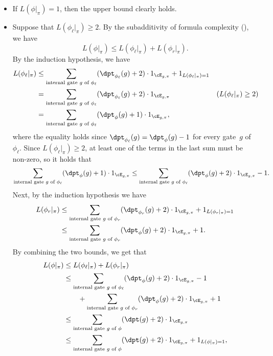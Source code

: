 \begin{itemize}
\item If $L(\phi|_{\pi})=1$, then the upper bound clearly holds. 
\item Suppose that $L(\phi_{\ell}|_{\pi})\ge2$. By the subadditivity of
formula complexity (), we have 
\[
L(\phi|_{\pi})\le L(\phi_{\ell}|_{\pi})+L(\phi_{r}|_{\pi}).
\]
By the induction hypothesis, we have 
\begin{align*}
L(\phi_{\ell}|_{\pi}) & \le\sum_{\text{internal gate }g\text{ of }\phi_{\ell}}(\dpt_{\phi_{\ell}}(g)+2)\cdot1_{\cE_{g,\pi}}+1_{L(\phi_{\ell}|_{\pi})=1}\\
 & =\sum_{\text{internal gate }g\text{ of }\phi_{\ell}}(\dpt_{\phi_{\ell}}(g)+2)\cdot1_{\cE_{g,\pi}} & (L(\phi_{\ell}|_{\pi})\ge2)\\
 & =\sum_{\text{internal gate }g\text{ of }\phi_{\ell}}(\dpt_{\phi}(g)+1)\cdot1_{\cE_{g,\pi}},
\end{align*}
where the equality holds since $\dpt_{\phi_{\ell}}(g)=\dpt_{\phi}(g)-1$
for every gate~$g$ of $\phi_{\ell}$. Since $L(\phi_{\ell}|_{\pi})\ge2$,
at least one of the terms in the last sum must be non-zero, so it
holds that 
\[
\sum_{\text{internal gate }g\text{ of }\phi_{\ell}}(\dpt_{\phi}(g)+1)\cdot1_{\cE_{g,\pi}}\le\sum_{\text{internal gate }g\text{ of }\phi_{\ell}}(\dpt_{\phi}(g)+2)\cdot1_{\cE_{g,\pi}}-1.
\]
Next, by the induction hypothesis we have 
\begin{align*}
L(\phi_{r}|_{\pi}) & \le\sum_{\text{internal gate }g\text{ of }\phi_{r}}(\dpt_{\phi_{r}}(g)+2)\cdot1_{\cE_{g,\pi}}+1_{L(\phi_{r}|_{\pi})=1}\\
 & \le\sum_{\text{internal gate }g\text{ of }\phi_{r}}(\dpt_{\phi}(g)+2)\cdot1_{\cE_{g,\pi}}+1.
\end{align*}
By combining the two bounds, we get that 
\begin{align*}
L(\phi|_{\pi}) & \le L(\phi_{\ell}|_{\pi})+L(\phi_{r}|_{\pi})\\
 & \le\sum_{\text{internal gate }g\text{ of }\phi_{\ell}}(\dpt_{\phi}(g)+2)\cdot1_{\cE_{g,\pi}}-1\\
 & \qquad+\sum_{\text{internal gate }g\text{ of }\phi_{r}}(\dpt_{\phi}(g)+2)\cdot1_{\cE_{g,\pi}}+1\\
 & \le\sum_{\text{internal gate }g\text{ of }\phi}(\dpt(g)+2)\cdot1_{\cE_{g,\pi}}\\
 & \le\sum_{\text{internal gate }g\text{ of }\phi}(\dpt(g)+2)\cdot1_{\cE_{g,\pi}}+1_{L(\phi|_{\pi})=1},
\end{align*}

\end{itemize}
